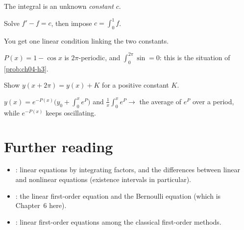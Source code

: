 \begin{hintlevels}
  \item The integral is an unknown \emph{constant} $c$.
  \item Solve $f' - f = c$, then impose $c = \int_0^1f$.
  \item You get one linear condition linking the two constants.
\end{hintlevels}

\begin{hintlevels}
  \item $P(x) = 1 - \cos x$ is $2\pi$-periodic, and $\int_0^{2\pi}\sin = 0$:
        this is the situation of \cref{prob:ch04-h3}.
  \item Show $y(x + 2\pi) = y(x) + K$ for a positive constant $K$.
  \item $y(x) = e^{-P(x)}\bigl(y_0 + \int_0^xe^{P}\bigr)$ and
        $\frac1x\int_0^xe^{P}\to$ the average of $e^{P}$ over a period, while
        $e^{-P(x)}$ keeps oscillating.
\end{hintlevels}

\section{Further reading}\label{sec:ch04-reading}

\begin{itemize}
  \item \textcite[\S2.1 and \S2.4]{BoyceDiPrima}: linear equations by
        integrating factors, and the differences between linear and nonlinear
        equations (existence intervals in particular).
  \item \textcite[Lesson 11]{TenenbaumPollard}: the linear first-order
        equation and the Bernoulli equation (which is Chapter~6 here).
  \item \textcite[Ch.~2]{Simmons}: linear first-order equations among the
        classical first-order methods.
\end{itemize}
